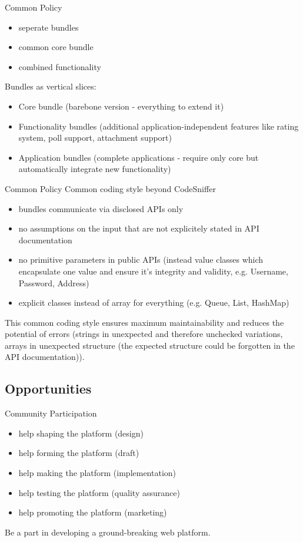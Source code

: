 \documentclass{beamer}
\begin{document}
	\begin{frame}{Common Policy}
		\begin{itemize}
			\item seperate bundles
			\item common core bundle
			\item combined functionality
		\end{itemize}
		
		Bundles as vertical slices:
		\begin{itemize}
			\item Core bundle (barebone version - everything to extend it)
			\item Functionality bundles (additional application-independent features like rating system, poll support, attachment support)
			\item Application bundles (complete applications - require only core but automatically integrate new functionality)
		\end{itemize}
	\end{frame}
	
	\begin{frame}{Common Policy}
		Common coding style beyond CodeSniffer
		\begin{itemize}
			\item bundles communicate via disclosed APIs only
			\item no assumptions on the input that are not explicitely stated in API documentation
			\item no primitive parameters in public APIs (instead value classes which encapsulate one value and ensure it's integrity and validity, e.g. Username, Password, Address)
			\item explicit classes instead of array for everything (e.g. Queue, List, HashMap)
		\end{itemize}
		This common coding style ensures maximum maintainability and reduces the potential of errors (strings in unexpected and therefore unchecked variations, arrays in unexpected structure (the expected structure could be forgotten in the API documentation)).
	\end{frame}
	
	\subsection{Opportunities}
	
	\begin{frame}{Community}
		Participation
		\begin{itemize}
			\item help shaping the platform (design)
			\item help forming the platform (draft)
			\item help making the platform (implementation)
			\item help testing the platform (quality assurance)
			\item help promoting the platform (marketing)
		\end{itemize}
		
		Be a part in developing a ground-breaking web platform.
	\end{frame}
	
\end{document}
